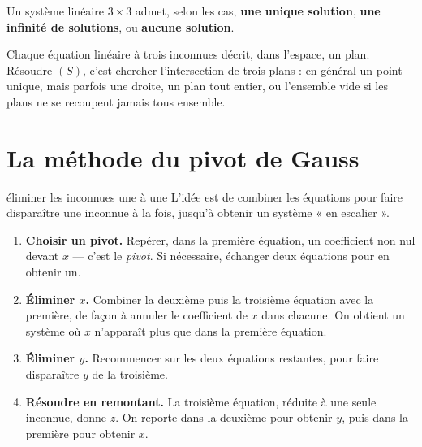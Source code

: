 \begin{propriete}
Un système linéaire $3\times3$ admet, selon les cas, \textbf{une unique
solution}, \textbf{une infinité de solutions}, ou \textbf{aucune solution}.
\end{propriete}

\begin{remarque}
Chaque équation linéaire à trois inconnues décrit, dans l'espace, un plan.
Résoudre $(S)$, c'est chercher l'intersection de trois plans : en général un
point unique, mais parfois une droite, un plan tout entier, ou l'ensemble
vide si les plans ne se recoupent jamais tous ensemble.
\end{remarque}

\section{La méthode du pivot de Gauss}

\begin{methode}{éliminer les inconnues une à une}
L'idée est de combiner les équations pour faire disparaître une inconnue à la
fois, jusqu'à obtenir un système « en escalier ».

\begin{enumerate}[label=\textbf{\arabic*.}, leftmargin=*, itemsep=0.3em]
  \item \textbf{Choisir un pivot.} Repérer, dans la première équation, un
        coefficient non nul devant $x$ — c'est le \emph{pivot}. Si nécessaire,
        échanger deux équations pour en obtenir un.
  \item \textbf{Éliminer $x$.} Combiner la deuxième puis la troisième équation
        avec la première, de façon à annuler le coefficient de $x$ dans
        chacune. On obtient un système où $x$ n'apparaît plus que dans la
        première équation.
  \item \textbf{Éliminer $y$.} Recommencer sur les deux équations restantes,
        pour faire disparaître $y$ de la troisième.
  \item \textbf{Résoudre en remontant.} La troisième équation, réduite à une
        seule inconnue, donne $z$. On reporte dans la deuxième pour obtenir
        $y$, puis dans la première pour obtenir $x$.
\end{enumerate}
\end{methode}

